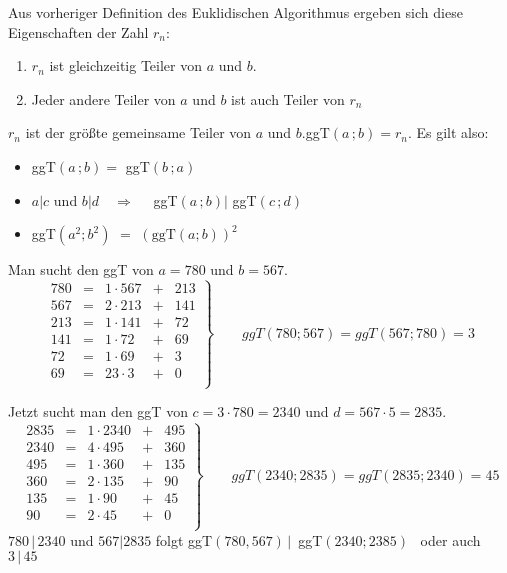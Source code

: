 \documentclass[main.tex]{subfiles}
\begin{document}
\begin{Theorem}
	Aus vorheriger Definition des Euklidischen Algorithmus ergeben sich diese Eigenschaften der Zahl $r_{n}$:
	\begin{enumerate}
		\item $r_{n}$ ist gleichzeitig Teiler von $a$ und $b$.
		\item Jeder andere Teiler von $a$ und $b$ ist auch Teiler von $r_{n}$
		\end{enumerate}
		$r_{n}$ ist der größte gemeinsame Teiler von $a$ und $b$.\quad ggT$(a\,;b) = r_{n}$. Es gilt also:
		\begin{itemize}
		\item ggT$(a\,;b) =$ ggT$(b\,;a)$
		\item $a | c$ und $b | d \quad \Rightarrow \quad$ ggT$(a\,;b) |$ ggT$(c\,;d)$
		\item ggT$(a^2;b^2)$ $=$ $\left ( \text{ggT}(a;b) \right )^2$
	\end{itemize}
\end{Theorem}

\begin{Beispiel}
	Man sucht den ggT von $a = 780$ und $b = 567$.
	$$\left. \begin{array}{rcccl}
		780 & = & 1 \cdot 567 & + & 213 \\
		567 & = & 2 \cdot 213 & + & 141 \\
		213 & = & 1 \cdot 141 & + & 72 \\
		141 & = & 1 \cdot 72 & + & 69 \\
		72 & = & 1 \cdot 69 & + & 3 \\
		69 & = & 23 \cdot 3 & + & 0 \\
	\end{array} \right\} \qquad ggT(780;567) = ggT(567;780) = 3$$

	Jetzt sucht man den ggT von $c = 3\cdot 780 = 2340$ und $d = 567 \cdot 5 = 2835$.
	$$\left. \begin{array}{rcccl}
		2835 & = & 1 \cdot 2340 & + & 495 \\
		2340 & = & 4 \cdot 495 & + & 360 \\
		495 & = & 1 \cdot 360 & + & 135 \\
		360 & = & 2 \cdot 135 & + & 90 \\
		135 & = & 1 \cdot 90 & + & 45 \\
		90 & = & 2 \cdot 45 & + & 0 \\
	\end{array} \right\} \qquad ggT(2340;2835) = ggT(2835;2340) = 45 $$
	$780\, |\, 2340$ und $567 | 2835$ \quad folgt \quad  ggT$(780,567)\, |\,$ ggT$(2340;2385)\,\,\,$ oder auch $3 \,|\, 45$
\end{Beispiel}
\end{document}
